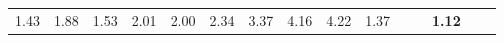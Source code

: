 \begin{tabular}{ll|rrrrrrrrr|rrrr}
  


  
  1.43 & 1.88 & 1.53 & 2.01 & 2.00 & 2.34 & 3.37 & 4.16 & 4.22 & 1.37 &  &  & \textbf{1.12} \\


\end{tabular}
